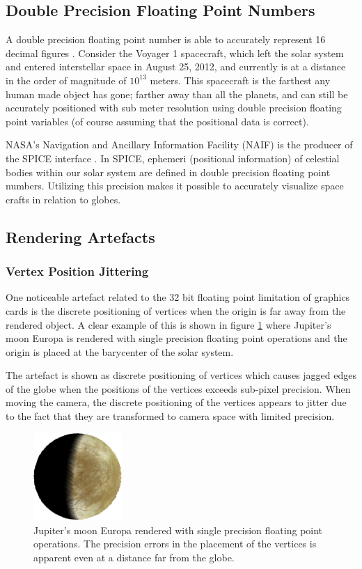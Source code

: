 \subsection{Double Precision Floating Point Numbers}

A double precision floating point number is able to accurately represent 16 decimal figures \cite{cozzi11}. Consider the Voyager 1 spacecraft, which left the solar system and entered interstellar space in August 25, 2012, and currently is at a distance in the order of magnitude of $10^{13}$ meters. This spacecraft is the farthest any human made object has gone; farther away than all the planets, and can still be accurately positioned with sub meter resolution using double precision floating point variables (of course assuming that the positional data is correct).

NASA's Navigation and Ancillary Information Facility (NAIF) is the producer of the SPICE interface \cite{spice}. In SPICE, ephemeri (positional information) of celestial bodies within our solar system are defined in double precision floating point numbers. Utilizing this precision makes it possible to accurately visualize space crafts in relation to globes.

\subsection{Rendering Artefacts}
\subsubsection{Vertex Position Jittering}

One noticeable artefact related to the 32 bit floating point limitation of graphics cards is the discrete positioning of vertices when the origin is far away from the rendered object. A clear example of this is shown in figure \ref{fig:jittering} where Jupiter's moon Europa is rendered with single precision floating point operations and the origin is placed at the barycenter of the solar system.

The artefact is shown as discrete positioning of vertices which causes jagged edges of the globe when the positions of the vertices exceeds sub-pixel precision. When moving the camera, the discrete positioning of the vertices appears to jitter due to the fact that they are transformed to camera space with limited precision.

\begin{figure}[htbp]
    \centering
    \includegraphics[width=0.3\textwidth]{figures/europa.png}
    \caption{Jupiter's moon Europa rendered with single precision floating point operations. The precision errors in the placement of the vertices is apparent even at a distance far from the globe.}
    \label{fig:jittering}
\end{figure}

